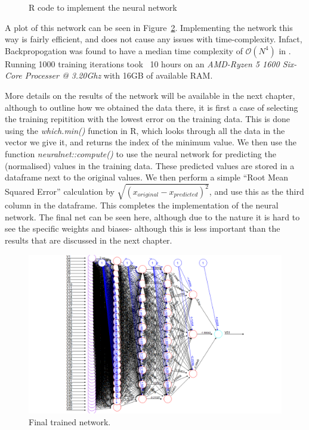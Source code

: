 \begin{figure}[h] %
    
    \caption{R code to implement the neural network}
    \label{nnRcode}
\end{figure}

A plot of this network can be seen in Figure~\ref{bestnet}. Implementing the network this way is fairly efficient, and does not cause any issues with time-complexity. Infact, Backpropogation 
was found to have a median time complexity of $\mathcal{O}(N^4)$ in \cite{lister}. Running 1000 training iterations took ~10 hours on an \textit{AMD-Ryzen 5 1600 Six-Core Processer @ 3.20Ghz} with 16GB of available RAM.

More details on the results of the network will be available in the next chapter, although to outline how we obtained the data there, it is first a case of selecting the training repitition 
with the lowest error on the training data. This is done using the \textit{which.min()} function in R, which looks through all the data in the vector we give it, and returns the index of the minimum value.
We then use the function \textit{neuralnet::compute()} to use the neural network for predicting the (normalised) values in the training data. These predicted values are stored in a dataframe next to the original values. 
We then perform a simple ``Root Mean Squared Error'' calculation by $\sqrt{(x_{original}-x_{predicted})^2}$, and use this as the third column in the dataframe. This completes the implementation of the neural network.
The final net can be seen here, although due to the nature it is hard to see the specific weights and biases- although this is less important than the results that are discussed in the next chapter. 

\begin{figure}[h] 
    \centering
    \includegraphics[width=0.9\linewidth]{figures/bestnet.png}
    \caption{Final trained network. }
    \label{bestnet}
\end{figure}
